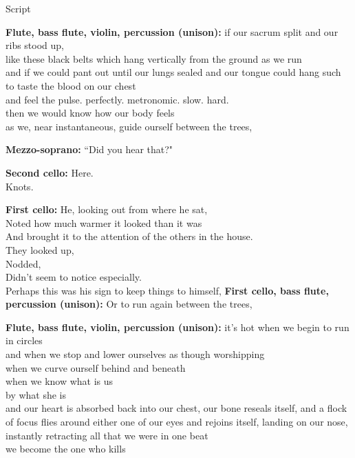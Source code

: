 \documentclass[11pt]{article}
\begin{document}
\begingroup
\begin{center}
\huge Script
\end{center}
\endgroup

\vspace*{2\baselineskip}

\begingroup
\textbf{Flute, bass flute, violin, percussion (unison):} if our sacrum split and our ribs stood up, \\ like these black belts which hang vertically from the ground as we run \\ and if we could pant out until our lungs sealed and our tongue could hang such to taste the blood on our chest \\ and feel the pulse. perfectly. metronomic. slow. hard. \\ then we would know how our body feels \\ as we, near instantaneous, guide ourself between the trees,
\endgroup

\begingroup
\textbf{Mezzo-soprano:} ``Did you hear that?"
\endgroup

\begingroup
\textbf{Second cello:} Here. \\ Knots.
\endgroup

\begingroup
\textbf{First cello:} He, looking out from where he sat, \\ Noted how much warmer it looked than it was \\ And brought it to the attention of the others in the house. \\ They looked up, \\ Nodded, \\ Didn't seem to notice especially. \\ Perhaps this was his sign to keep things to himself, \textbf{First cello, bass flute, percussion (unison):} Or to run again between the trees,
\endgroup

\begingroup
\textbf{Flute, bass flute, violin, percussion (unison):} it's hot when we begin to run in circles \\ and when we stop and lower ourselves as though worshipping \\ when we curve ourself behind and beneath \\ when we know what is us \\ by what she is \\ and our heart is absorbed back into our chest, our bone reseals itself, and a flock of focus flies around either one of our eyes and rejoins itself, landing on our nose, instantly retracting all that we were in one beat \\ we become the one who kills
\endgroup
\end{document}
